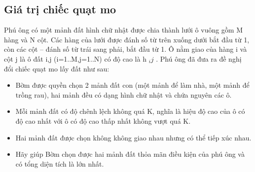 \subsection{   Giá trị chiếc quạt mo  }

   Phú ông có một mảnh đất hình chữ nhật được chia thành lưới ô vuông gồm M hàng và N cột. Các hàng của lưới được đánh số từ trên xuống dưới bắt đầu từ 1, còn các cột – đánh số từ trái sang phải, bắt đầu từ 1. Ô nằm giao của hàng i và cột j là ô đất i,j (i=1..M,j=1..N) có độ cao là h   $_    ij   $   . Phú ông đã đưa ra đề nghị đổi chiếc quạt mo lấy đất như sau:  
\begin{itemize}
	\item     Bờm được quyền chọn 2 mảnh đất con (một mảnh để làm nhà, một mảnh để trồng rau), hai mảnh đều có dạng hình chữ nhật và chứa nguyên các ô.   
	\item     Mỗi mảnh đất có độ chênh lệch không quá K, nghĩa là hiệu độ cao của ô có độ cao nhất với ô có độ cao thấp nhất không vượt quá K.   
	\item     Hai mảnh đất được chọn không không giao nhau nhưng có thể tiếp xúc nhau.   
	\item     Hãy giúp Bờm chọn được hai mảnh đất thỏa mãn điều kiện của phú ông và có tổng diện tích là lớn nhất.   
\end{itemize}